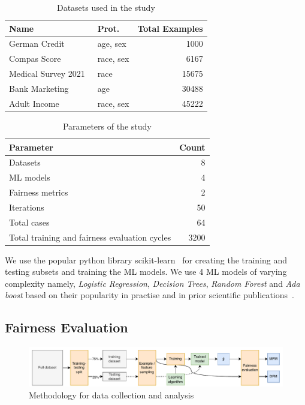 \documentclass{article}
\begin{document}
\begin{table}
  \centering
  \caption{Datasets used in the study}
  \begin{tabular}{l l r}
    \toprule
    \textbf{Name} & \textbf{Prot.} & \textbf{Total Examples}\\
    \midrule
    German Credit \cite{CITEME} & age, sex & 1000\\
    Compas Score \cite{CITEME} & race, sex & 6167\\
    Medical Survey 2021 \cite{CITEME} & race & 15675\\
    Bank Marketing \cite{CITEME} & age & 30488\\
    Adult Income \cite{CITEME} & race, sex & 45222\\
    \bottomrule
  \end{tabular}
  \label{tab:datasets}
\end{table}

\begin{table}
  \centering
  \caption{Parameters of the study}
  \begin{tabular}{lr}
    \toprule
    \textbf{Parameter} & \textbf{Count}\\
    \midrule
    Datasets & 8\\
    ML models & 4\\
    Fairness metrics & 2\\
    Iterations & 50\\
    Total cases & 64\\
    Total training and fairness evaluation cycles & 3200\\
    \bottomrule
  \end{tabular}
  \label{tab:parameters}
\end{table}

We use the popular python library scikit-learn \cite{sklearn} for
creating the training and testing subsets and training the ML models.
We use 4 ML models of varying complexity namely, \emph{Logistic
Regression}, \emph{Decision Trees}, \emph{Random Forest} and \emph{Ada
boost} based on their popularity in practise and in prior scientific
publications \cite{CITEME}.

\subsection{Fairness Evaluation}\label{sec:method-fair-eval}

\begin{figure}
  \centering
  \includegraphics[width=0.95\linewidth]{method.pdf}
  \caption{Methodology for data collection and analysis}
  \label{fig:method}
\end{figure}
\end{document}
